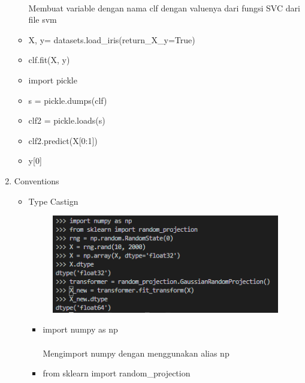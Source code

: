 \documentclass{article}
\begin{document}
\begin{enumerate}
\begin{itemize}
                        \paragraph{}Membuat variable dengan nama clf dengan valuenya dari fungsi SVC dari file svm
                    \item X, y= datasets.load\_iris(return\_X\_y=True)
                    \item clf.fit(X, y)
                    \item import pickle
                    \item s = pickle.dumps(clf)
                    \item clf2 = pickle.loads(s)
                    \item clf2.predict(X[0:1])
                    \item y[0]
                \end{itemize}
            \item Conventions
                \begin{itemize}
                    \item Type Castign
                        \begin{figure}[ht]
                            \centerline{\includegraphics[width=10cm]{5.PNG}}
                        \end{figure}
                        \begin{itemize}
                            \item import numpy as np
                                \paragraph{}Mengimport numpy dengan menggunakan alias np
                            \item from sklearn import random\_projection

\end{itemize}
\end{itemize}
\end{enumerate}
\end{document}
